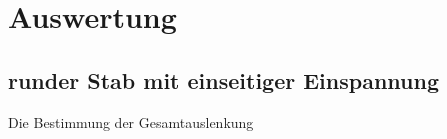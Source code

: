 \section{Auswertung}
\label{sec:Auswertung}

\subsection{runder Stab mit einseitiger Einspannung}
 Die Bestimmung der Gesamtauslenkung
